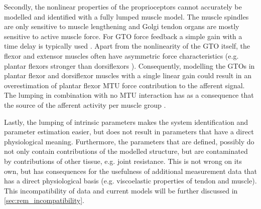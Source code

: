 Secondly, the nonlinear properties of the proprioceptors cannot accurately be modelled and identified with a fully lumped muscle model. The muscle spindles are only sensitive to muscle lengthening and Golgi tendon organs are mostly sensitive to active muscle force. For GTO force feedback a simple gain with a time delay is typically used \cite{schouten_nmclab_2008, mugge_rigorous_2010}. Apart from the nonlinearity of the GTO itself, the flexor and extensor muscles often have asymmetric force characteristics (e.g. plantar flexors stronger than dorsiflexors \cite{fukunaga_specific_1996}). Consequently, modelling the GTOs in plantar flexor and dorsiflexor muscles with a single linear gain could result in an overestimation of plantar flexor MTU force contribution to the afferent signal. The lumping in combination with no MTU interaction has as a consequence that the source of the afferent activity per muscle group . 

Lastly, the lumping of intrinsic parameters makes the system identification and parameter estimation easier, but does not result in parameters that have a direct physiological meaning. Furthermore, the parameters that are defined, possibly do not only contain contributions of the modelled structure, but are contaminated by contributions of other tissue, e.g. joint resistance. This is not wrong on its own, but has consequences for the usefulness of additional measurement data that has a direct physiological basis (e.g. viscoelastic properties of tendon and muscle). This incompatibility of data and current models will be further discussed in \autoref{sec:rem_incompatibility}. 
















\begin{landscape}



\end{landscape}
